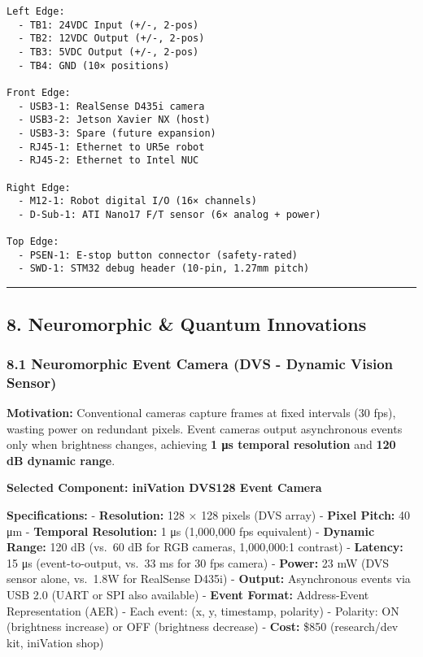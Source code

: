 \documentclass[
]{article}
\begin{document}
\begin{verbatim}
Left Edge:
  - TB1: 24VDC Input (+/-, 2-pos)
  - TB2: 12VDC Output (+/-, 2-pos)
  - TB3: 5VDC Output (+/-, 2-pos)
  - TB4: GND (10× positions)

Front Edge:
  - USB3-1: RealSense D435i camera
  - USB3-2: Jetson Xavier NX (host)
  - USB3-3: Spare (future expansion)
  - RJ45-1: Ethernet to UR5e robot
  - RJ45-2: Ethernet to Intel NUC

Right Edge:
  - M12-1: Robot digital I/O (16× channels)
  - D-Sub-1: ATI Nano17 F/T sensor (6× analog + power)

Top Edge:
  - PSEN-1: E-stop button connector (safety-rated)
  - SWD-1: STM32 debug header (10-pin, 1.27mm pitch)
\end{verbatim}

\begin{center}\rule{0.5\linewidth}{0.5pt}\end{center}

\hypertarget{neuromorphic-quantum-innovations}{%
\subsection{8. Neuromorphic \& Quantum
Innovations}\label{neuromorphic-quantum-innovations}}

\hypertarget{neuromorphic-event-camera-dvs---dynamic-vision-sensor}{%
\subsubsection{8.1 Neuromorphic Event Camera (DVS - Dynamic Vision
Sensor)}\label{neuromorphic-event-camera-dvs---dynamic-vision-sensor}}

\textbf{Motivation:} Conventional cameras capture frames at fixed
intervals (30 fps), wasting power on redundant pixels. Event cameras
output asynchronous events only when brightness changes, achieving
\textbf{1 μs temporal resolution} and \textbf{120 dB dynamic range}.

\textbf{Selected Component: iniVation DVS128 Event Camera}

\textbf{Specifications:} - \textbf{Resolution:} 128 × 128 pixels (DVS
array) - \textbf{Pixel Pitch:} 40 μm - \textbf{Temporal Resolution:} 1
μs (1,000,000 fps equivalent) - \textbf{Dynamic Range:} 120 dB (vs.~60
dB for RGB cameras, 1,000,000:1 contrast) - \textbf{Latency:} 15 μs
(event-to-output, vs.~33 ms for 30 fps camera) - \textbf{Power:} 23 mW
(DVS sensor alone, vs.~1.8W for RealSense D435i) - \textbf{Output:}
Asynchronous events via USB 2.0 (UART or SPI also available) -
\textbf{Event Format:} Address-Event Representation (AER) - Each event:
(x, y, timestamp, polarity) - Polarity: ON (brightness increase) or OFF
(brightness decrease) - \textbf{Cost:} \$850 (research/dev kit,
iniVation shop)
\end{document}
